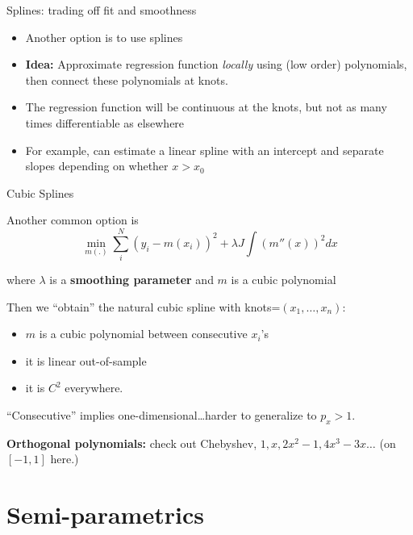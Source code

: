 \begin{frame}{Splines: trading off fit and smoothness}

  \begin{itemize}
    \item Another option is to use splines
    \item {\bf Idea:} Approximate regression function \textit{locally} using (low order) polynomials, then connect these polynomials at knots. 
    \item The regression function will be continuous at the knots, but not as many times differentiable as elsewhere
    \item For example, can estimate a linear spline with an intercept and separate slopes depending on whether $x > x_0$
  \end{itemize}
\end{frame} 

\begin{frame}{Cubic Splines}

Another common option is 
\[
\min_{m(.)} \sum_i^N (y_i-m(x_i))^2 +\lambda J \int (m''(x))^2 dx 
\]

where $\lambda$ is a \textbf{smoothing parameter} and $m$ is a cubic polynomial 

Then we ``obtain'' the natural cubic spline with knots=$(x_1,\ldots,x_n)$:

\begin{itemize}[<+->]
\item $m$ is a cubic polynomial between consecutive $x_i$'s
\item it is linear out-of-sample
\item it is $C^2$ everywhere. 
\end{itemize}

\pause

``Consecutive'' implies one-dimensional\ldots harder to generalize to
$p_x>1$.

\pause

\textbf{Orthogonal polynomials:} check out Chebyshev, $1, x,
2x^2-1,4x^3-3x\ldots$ (on $[-1,1]$ here.)

\end{frame}



\section{Semi-parametrics}


